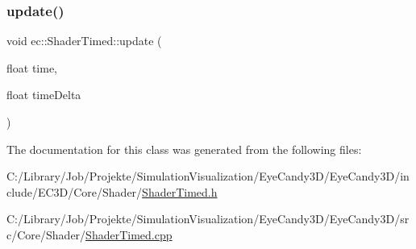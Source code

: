\subsubsection{\texorpdfstring{update()}{update()}}
{\footnotesize\ttfamily void ec\+::\+Shader\+Timed\+::update (\begin{DoxyParamCaption}\item[{float}]{time,  }\item[{float}]{time\+Delta }\end{DoxyParamCaption})\hspace{0.3cm}{\ttfamily [virtual]}}



The documentation for this class was generated from the following files\+:\begin{DoxyCompactItemize}
\item 
C\+:/\+Library/\+Job/\+Projekte/\+Simulation\+Visualization/\+Eye\+Candy3\+D/\+Eye\+Candy3\+D/include/\+E\+C3\+D/\+Core/\+Shader/\mbox{\hyperlink{_shader_timed_8h}{Shader\+Timed.\+h}}\item 
C\+:/\+Library/\+Job/\+Projekte/\+Simulation\+Visualization/\+Eye\+Candy3\+D/\+Eye\+Candy3\+D/src/\+Core/\+Shader/\mbox{\hyperlink{_shader_timed_8cpp}{Shader\+Timed.\+cpp}}\end{DoxyCompactItemize}
